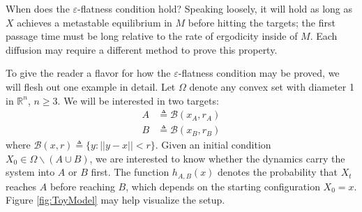 \documentclass[12pt, nofootinbib,english, amsmath, amssymb, aps, priprint, graphicx,floatfix]{revtex4-1}
\theoremstyle{plain}
\theoremstyle{definition}
\theoremstyle{plain}
\newcommand{\bb}[1]{\mathcal{B}\left(#1\right)}
\begin{document}
When does the $\varepsilon$-flatness condition hold?  Speaking loosely, it will hold as long as $X$ achieves a metastable equilibrium in $M$ before hitting the targets; the first passage time must be long relative to the rate of ergodicity inside of $M$.  Each diffusion may require a different method to prove this property.  

To give the reader a flavor for how the $\varepsilon$-flatness condition may be proved, we will flesh out one example in detail.  Let $\Omega$ denote any convex set with diameter 1 in $\mathbb{R}^n$, $n\geq 3$.  We will be interested in two targets:
\begin{align*}
A &\triangleq \bb {x_A, r_A}\\
B &\triangleq \bb {x_B, r_B}
\end{align*}
where $\bb{x, r} \triangleq \{ y : || y - x || < r \}$.  Given an initial condition $X_0\in \Omega \backslash (A\cup B)$, we are interested to know whether the dynamics carry the system into $A$ or $B$ first.  The function $h_{A,B}(x)$ denotes the probability that $X_t$ reaches $A$ before reaching $B$, which depends on the starting configuration $X_0=x$.  Figure \ref{fig:ToyModel} may help visualize the setup.
\end{document}
